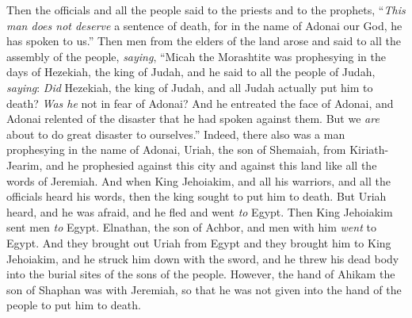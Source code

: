 \begin{biblechapter}
\verse Then the officials and all the people said to the priests and to the prophets, “\textit{This man does not deserve} a sentence of death, for in the name of Adonai our God, he has spoken to us.”
\verse Then men from the elders of the land arose and said to all the assembly of the people, \textit{saying},
\verse “Micah the Morashtite was prophesying in the days of Hezekiah, the king of Judah, and he said to all the people of Judah, \textit{saying}:
\verse \textit{Did} Hezekiah, the king of Judah, and all Judah actually put him to death? \textit{Was he} not in fear of Adonai? And he entreated the face of Adonai, and Adonai relented of the disaster that he had spoken against them. But we \textit{are} about to do great disaster to ourselves.”
\verse Indeed, there also was a man prophesying in the name of Adonai, Uriah, the son of Shemaiah, from Kiriath-Jearim, and he prophesied against this city and against this land like all the words of Jeremiah.
\verse And when King Jehoiakim, and all his warriors, and all the officials heard his words, then the king sought to put him to death. But Uriah heard, and he was afraid, and he fled and went \textit{to} Egypt.
\verse Then King Jehoiakim sent men \textit{to} Egypt. Elnathan, the son of Achbor, and men with him \textit{went} to Egypt.
\verse And they brought out Uriah from Egypt and they brought him to King Jehoiakim, and he struck him down with the sword, and he threw his dead body into the burial sites of the sons of the people.
\verse However, the hand of Ahikam the son of Shaphan was with Jeremiah, so that he was not given into the hand of the people to put him to death.
\end{biblechapter}

